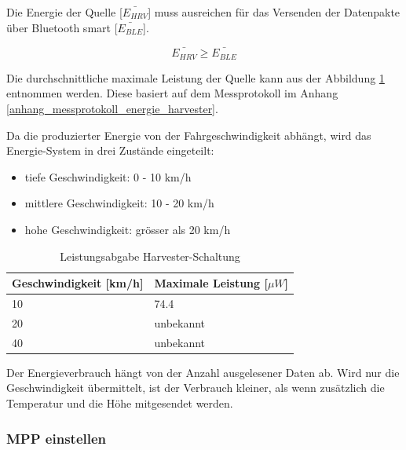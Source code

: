 Die Energie der Quelle [$\bar{E_{HRV}} $] muss ausreichen für das Versenden der Datenpakte über Bluetooth smart [$\bar{E_{BLE}}$].

\[\bar{E_{HRV}} \ge \bar{E_{BLE}}  \]


Die durchschnittliche maximale Leistung der Quelle kann aus der Abbildung \ref{MPP_Werte} entnommen werden. Diese basiert auf dem Messprotokoll im Anhang \ref{anhang_messprotokoll_energie_harvester}. 

Da die produzierter Energie von der Fahrgeschwindigkeit abhängt, wird das Energie-System in drei Zustände eingeteilt:

\begin{itemize}
    \item tiefe Geschwindigkeit: 0 - 10 km/h
    \item mittlere Geschwindigkeit: 10 - 20 km/h 
    \item hohe Geschwindigkeit: grösser als 20 km/h 
\end{itemize}

\begin{table}[ht]
\begin{tabular}{|l|l|}\hline \label{MPP_Werte} 
    Geschwindigkeit [km/h] & Maximale Leistung [$\mu W$] \\ \hline
    10 & 74.4 \\ \hline
    20 & unbekannt \\ \hline
    40 & unbekannt \\ \hline
\end{tabular}
\caption{Leistungsabgabe Harvester-Schaltung}
\end{table}

Der Energieverbrauch hängt von der Anzahl ausgelesener Daten ab. Wird nur die Geschwindigkeit übermittelt, ist der Verbrauch kleiner, als wenn zusätzlich die Temperatur und die Höhe mitgesendet werden.


\subsubsection{MPP einstellen}

%
% 
%

